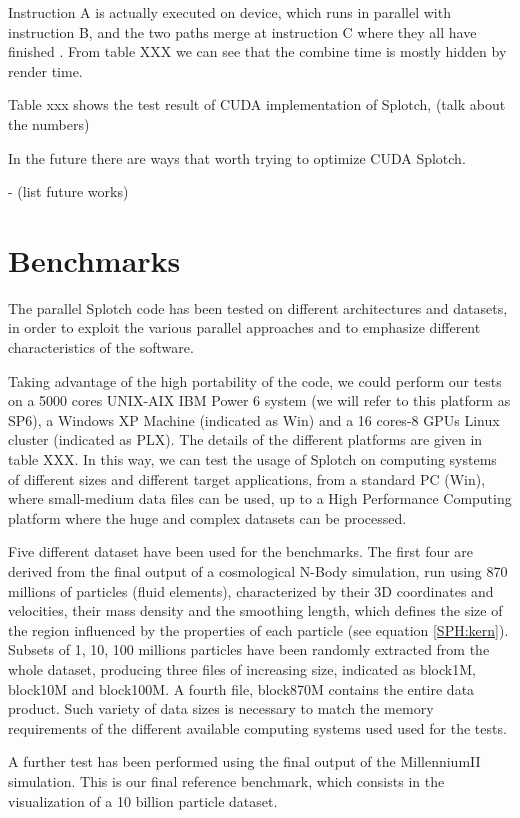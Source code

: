 Instruction A is actually executed on device, which runs in parallel with 
instruction B, and the two paths merge at instruction C where they all have finished
. From table XXX we can see that the combine time is mostly hidden by render time.

Table xxx shows the test result of CUDA implementation of Splotch, (talk about the numbers)

In the future there are ways that worth trying to optimize CUDA Splotch.

- (list future works)


\section{Benchmarks}

The parallel Splotch code has been tested on different architectures and datasets, in order to 
exploit the various parallel approaches and to emphasize different characteristics of the software.

Taking advantage of the high portability of the code, we could perform our tests on a 5000 cores UNIX-AIX 
IBM Power 6 system (we will refer to this platform as SP6), a Windows XP Machine (indicated as Win)
and a 16 cores-8 GPUs Linux cluster (indicated as PLX). The details of the different platforms are given 
in table XXX. In this way, we can test the usage of Splotch on computing systems 
of different sizes and different target applications, from a standard PC (Win), where small-medium
data files can be used, up to 
a High Performance Computing platform where the huge and complex datasets can be processed.

Five different dataset have been used for the benchmarks. The first four are derived from 
the final output of a cosmological N-Body simulation, run using 870 millions of particles 
(fluid elements), characterized by their 3D coordinates and velocities, their mass density 
and the smoothing length, which defines the size of the region influenced by the properties
of each particle (see equation \ref{SPH:kern}). Subsets of 1, 10, 100 millions particles have been
randomly extracted from the whole dataset, producing three files of increasing size, indicated as
block1M, block10M and block100M. A fourth file, block870M contains the entire data product. 
Such variety of data sizes is necessary to match the memory requirements of the different available 
computing systems used used for the tests.

A further test has been performed using the final output of the MillenniumII simulation. 
This is our final reference benchmark, which consists in the visualization of a 10 billion
particle dataset.

